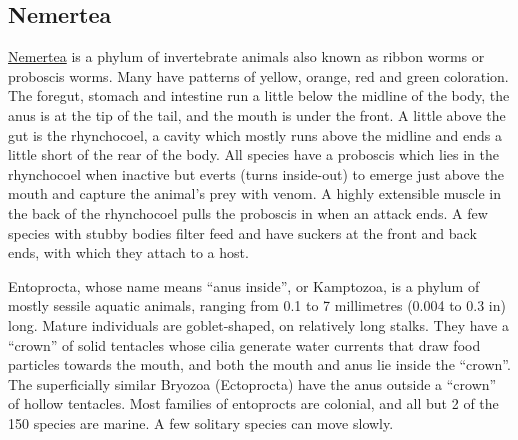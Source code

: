 \hypertarget{nemertea}{%
\subsection{Nemertea}\label{nemertea}}

\href{https://en.wikipedia.org/wiki/Nemertea}{Nemertea} is a phylum of invertebrate animals also known as ribbon worms or proboscis worms. Many have patterns of yellow, orange, red and green coloration. The foregut, stomach and intestine run a little below the midline of the body, the anus is at the tip of the tail, and the mouth is under the front. A little above the gut is the rhynchocoel, a cavity which mostly runs above the midline and ends a little short of the rear of the body. All species have a proboscis which lies in the rhynchocoel when inactive but everts (turns inside-out) to emerge just above the mouth and capture the animal's prey with venom. A highly extensible muscle in the back of the rhynchocoel pulls the proboscis in when an attack ends. A few species with stubby bodies filter feed and have suckers at the front and back ends, with which they attach to a host.

Entoprocta, whose name means ``anus inside'', or Kamptozoa, is a phylum of mostly sessile aquatic animals, ranging from 0.1 to 7 millimetres (0.004 to 0.3 in) long. Mature individuals are goblet-shaped, on relatively long stalks. They have a ``crown'' of solid tentacles whose cilia generate water currents that draw food particles towards the mouth, and both the mouth and anus lie inside the ``crown''. The superficially similar Bryozoa (Ectoprocta) have the anus outside a ``crown'' of hollow tentacles. Most families of entoprocts are colonial, and all but 2 of the 150 species are marine. A few solitary species can move slowly.



